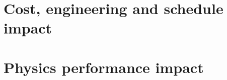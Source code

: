 
\chapter{Cost, engineering and schedule impact}
\label{cha:engineering}




%





\chapter{Physics performance impact}
\label{cha:performance}



